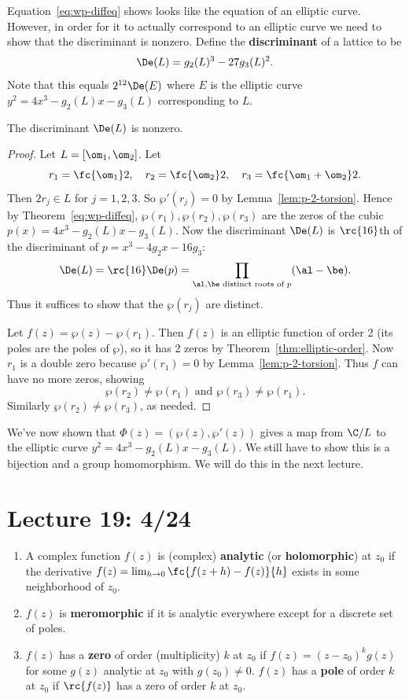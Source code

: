 Equation~\eqref{eq:wp-diffeq} shows looks like the equation of an elliptic curve. However, in order for it to actually correspond to an elliptic curve we need to show that the discriminant is nonzero. Define the \textbf{discriminant} of a lattice to be
\[
\De(L)=g_2(L)^3-27g_3(L)^2.
\]
Note that this equals $2^{12}\De(E)$ where $E$ is the elliptic curve $y^2=4x^3-g_2(L)x-g_3(L)$ corresponding to $L$.
\begin{lem}
The discriminant $\De(L)$ is nonzero.
\end{lem}
\begin{proof}
Let $L=[\om_1,\om_2]$. Let
\[
r_1=\fc{\om_1}2,\quad r_2=\fc{\om_2}2,\quad r_3=\fc{\om_1+\om_2}2.
\]
Then $2r_j\in L$ for $j=1,2,3$. So
$\wp'(r_j)=0$ by Lemma~\ref{lem:p-2-torsion}. Hence by Theorem~\ref{eq:wp-diffeq}, $\wp(r_1),\wp(r_2),\wp(r_3)$ are the zeros of the cubic $p(x)=4x^3-g_2(L)x-g_3(L)$. Now the discriminant $\De(L)$ is $\rc{16}$th of the discriminant of $p=x^3-4g_2x-16g_3$:
\[
\De(L)=\rc{16}\De(p)=\prod_{\al,\be \text{ distinct roots of }p}(\al-\be).
\] 
Thus it suffices to show that the $\wp(r_j)$ are distinct.

Let $f(z)=\wp(z)-\wp(r_1)$. Then $f(z)$ is an elliptic function of order 2 (its poles are the poles of $\wp$), so it has 2 zeros by Theorem~\ref{thm:elliptic-order}. Now $r_1$ is a double zero because $\wp'(r_1)=0$ by Lemma~\ref{lem:p-2-torsion}. Thus $f$ can have no more zeros, showing
\[
\wp(r_2)\ne \wp(r_1)\text{ and }\wp(r_3)\ne \wp(r_1).
\]
Similarly $\wp(r_2)\ne \wp(r_3)$, as needed.
\end{proof}
We've now shown that $\Phi(z)=(\wp(z),\wp'(z))$ gives a map from $\C/L$ to the elliptic curve $y^2=4x^3-g_2(L)x-g_3(L)$. We still have to show this is a bijection and a group homomorphism. We will do this in the next lecture.
\section{Lecture 19: 4/24}
\begin{df}
\begin{enumerate}
\item
A complex function $f(z)$ is (complex) \textbf{analytic} (or \textbf{holomorphic}) at $z_0$ if the derivative $f(z)=\lim_{h\to 0} \fc{f(z+h)-f(z)}{h}$ exists in some neighborhood of $z_0$.
\item
$f(z)$ is \textbf{meromorphic} if it is analytic everywhere except for a discrete set of poles.
\item
$f(z)$ has a \textbf{zero} of order (multiplicity) $k$ at $z_0$ if $f(z)=(z-z_0)^kg(z)$ for some $g(z)$ analytic at $z_0$ with $g(z_0)\ne 0$. $f(z)$ has a \textbf{pole} of order $k$ at $z_0$ if $\rc{f(z)}$ has a zero of order $k$ at $z_0$.
\end{enumerate}
\end{df}

